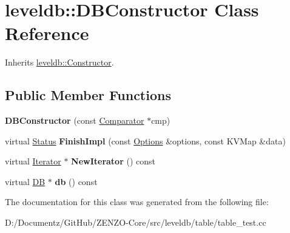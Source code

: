 \hypertarget{classleveldb_1_1_d_b_constructor}{}\section{leveldb\+::D\+B\+Constructor Class Reference}
\label{classleveldb_1_1_d_b_constructor}


Inherits \mbox{\hyperlink{classleveldb_1_1_constructor}{leveldb\+::\+Constructor}}.

\subsection*{Public Member Functions}
\begin{DoxyCompactItemize}
\item 
\mbox{\label{classleveldb_1_1_d_b_constructor_ae27ecdd7732629b08c25a63f82dfd4a9}} 
{\bfseries D\+B\+Constructor} (const \mbox{\hyperlink{structleveldb_1_1_comparator}{Comparator}} $\ast$cmp)
\item 
\mbox{\label{classleveldb_1_1_d_b_constructor_a554d8e348d9135ff72a43a03c647c261}} 
virtual \mbox{\hyperlink{classleveldb_1_1_status}{Status}} {\bfseries Finish\+Impl} (const \mbox{\hyperlink{structleveldb_1_1_options}{Options}} \&options, const K\+V\+Map \&data)
\item 
\mbox{\label{classleveldb_1_1_d_b_constructor_a56f4fcae314be89539d319ae71016785}} 
virtual \mbox{\hyperlink{classleveldb_1_1_iterator}{Iterator}} $\ast$ {\bfseries New\+Iterator} () const
\item 
\mbox{\label{classleveldb_1_1_d_b_constructor_afd4a66dce1cd87d02c5e16d13165dabd}} 
virtual \mbox{\hyperlink{classleveldb_1_1_d_b}{DB}} $\ast$ {\bfseries db} () const
\end{DoxyCompactItemize}


The documentation for this class was generated from the following file\+:\begin{DoxyCompactItemize}
\item 
D\+:/\+Documentz/\+Git\+Hub/\+Z\+E\+N\+Z\+O-\/\+Core/src/leveldb/table/table\+\_\+test.\+cc\end{DoxyCompactItemize}
